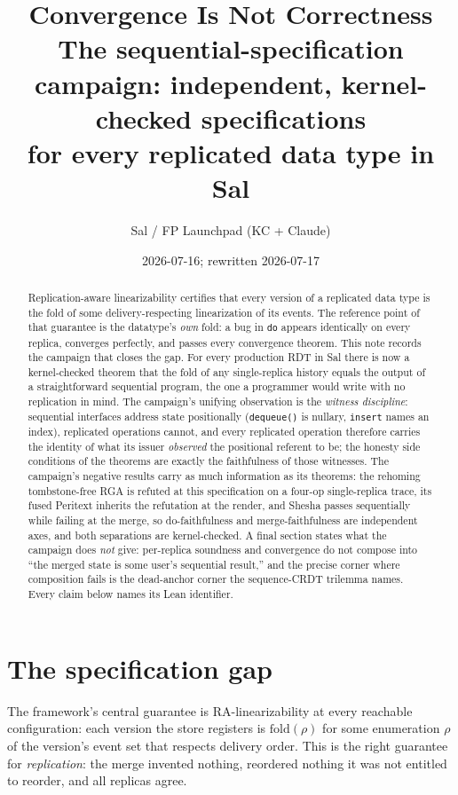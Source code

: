 \documentclass[11pt]{article}
\title{\bfseries Convergence Is Not Correctness\\[3pt]
\large The sequential-specification campaign: independent,
kernel-checked specifications\\ for every replicated data type in Sal}
\author{Sal / FP Launchpad (KC + Claude)}
\date{2026-07-16; rewritten 2026-07-17}
\newcommand{\code}[1]{\texttt{#1}}
\begin{document}
\maketitle
\sloppy

\begin{abstract}
\noindent
Replication-aware linearizability certifies that every version of a
replicated data type is the fold of some delivery-respecting
linearization of its events. The reference point of that guarantee is
the datatype's \emph{own} fold: a bug in \code{do} appears identically
on every replica, converges perfectly, and passes every convergence
theorem. This note records the campaign that closes the gap. For every
production RDT in Sal there is now a kernel-checked theorem that the
fold of any single-replica history equals the output of a
straightforward sequential program, the one a programmer would write
with no replication in mind. The campaign's unifying observation is
the \emph{witness discipline}: sequential interfaces address state
positionally (\code{dequeue()} is nullary, \code{insert} names an
index), replicated operations cannot, and every replicated operation
therefore carries the identity of what its issuer \emph{observed} the
positional referent to be; the honesty side conditions of the theorems
are exactly the faithfulness of those witnesses. The campaign's
negative results carry as much information as its theorems: the
rehoming tombstone-free RGA is refuted at this specification on a
four-op single-replica trace, its fused Peritext inherits the
refutation at the render, and Shesha passes sequentially while failing
at the merge, so do-faithfulness and merge-faithfulness are
independent axes, and both separations are kernel-checked. A final
section states what the campaign does \emph{not} give: per-replica
soundness and convergence do not compose into ``the merged state is
some user's sequential result,'' and the precise corner where
composition fails is the dead-anchor corner the sequence-CRDT
trilemma names. Every claim below names its Lean identifier.
\end{abstract}

\section{The specification gap}
\label{sec:gap}

The framework's central guarantee is RA-linearizability at every
reachable configuration: each version the store registers is
$\mathrm{fold}(\rho)$ for some enumeration $\rho$ of the version's
event set that respects delivery order. This is the right guarantee
for \emph{replication}: the merge invented nothing, reordered nothing
it was not entitled to reorder, and all replicas agree.
\end{document}
